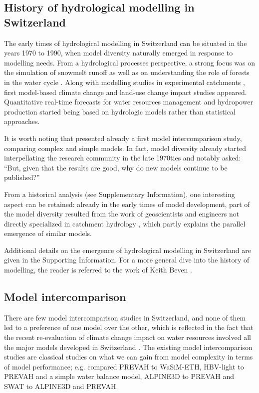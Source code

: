 \documentclass[10pt,a4paper]{article}
\begin{document}
\subsection{History of hydrological modelling in Switzerland}
\label{sec:models:history}

The early times of hydrological modelling in Switzerland can be situated
in the years 1970 to 1990, when model diversity naturally emerged in
response to modelling needs. From a hydrological processes perspective,
a strong focus was on the simulation of snowmelt
runoff \citep{braun1986} as well as on understanding the role of
forests in the water cycle \citep{keller1991,forster1989}. Along with modelling
studies in experimental catchments \citep{Iorgulescu1994}, first model-based
climate change \citep{bultot1992a} and land-use change \citep{jordan1990a}
impact studies appeared. Quantitative real-time forecasts for water
resources management \citep{p1969} and hydropower
production \citep{jensenlang1973} started being based on hydrologic models
rather than statistical approaches.

It is worth noting that \citet{naef1977} presented already a first
model intercomparison study, comparing complex and simple models. In
fact, model diversity already started interpellating the research
community in the late 1970ties and \citet{f1981} notably asked:
``But, given that the results are good, why do new models continue to be
published?'' 

From a historical analysis (see Supplementary Information), one
interesting aspect can be retained: already in the early times of model
development, part of the model diversity resulted from the work of
geoscientists and engineers not directly specialized in catchment
hydrology \citep{Abednego1990,k1986a,hager1984,sautier1980}, which partly explains the parallel
emergence of similar models. 

Additional details on the emergence of hydrological modelling in
Switzerland are given in the Supporting Information. For a more general
dive into the history of modelling, the reader is referred to the work
of Keith Beven \citep{Beven_2020,Beven_2020a}.

\subsection{Model intercomparison}
\label{sec:models:intercomparison}

There are few model intercomparison studies in Switzerland, and none of
them led to a preference of one model over the other, which is reflected
in the fact that the recent re-evaluation of climate change impact on
water resources involved all the major models developed in Switzerland
 \citep{bafu2021}. The existing model intercomparison studies are
classical studies on what we can gain from model complexity in terms of
model performance; e.g. \citet{Gurtz2003} compared PREVAH to
WaSiM-ETH, \citet{Orth2015} HBV-light to PREVAH and a simple water
balance model, \citet{Kobierska_2013} ALPINE3D to PREVAH
and \citet{Andrianaki2019} SWAT to ALPINE3D and PREVAH.
\end{document}
